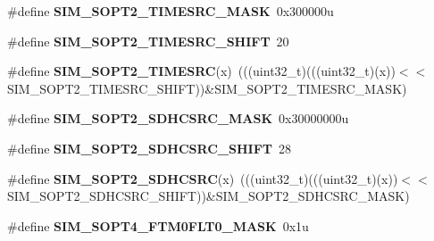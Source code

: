 \begin{DoxyCompactItemize}
\item 
\#define {\bfseries S\+I\+M\+\_\+\+S\+O\+P\+T2\+\_\+\+T\+I\+M\+E\+S\+R\+C\+\_\+\+M\+A\+SK}~0x300000u\hypertarget{group__SIM__Register__Masks_gab50a6e7eaa3b552b96f8cd0450a95395}{}\label{group__SIM__Register__Masks_gab50a6e7eaa3b552b96f8cd0450a95395}

\item 
\#define {\bfseries S\+I\+M\+\_\+\+S\+O\+P\+T2\+\_\+\+T\+I\+M\+E\+S\+R\+C\+\_\+\+S\+H\+I\+FT}~20\hypertarget{group__SIM__Register__Masks_ga808182bbe91aa5fedaede7122e4af1aa}{}\label{group__SIM__Register__Masks_ga808182bbe91aa5fedaede7122e4af1aa}

\item 
\#define {\bfseries S\+I\+M\+\_\+\+S\+O\+P\+T2\+\_\+\+T\+I\+M\+E\+S\+RC}(x)~(((uint32\+\_\+t)(((uint32\+\_\+t)(x))$<$$<$S\+I\+M\+\_\+\+S\+O\+P\+T2\+\_\+\+T\+I\+M\+E\+S\+R\+C\+\_\+\+S\+H\+I\+FT))\&S\+I\+M\+\_\+\+S\+O\+P\+T2\+\_\+\+T\+I\+M\+E\+S\+R\+C\+\_\+\+M\+A\+SK)\hypertarget{group__SIM__Register__Masks_gaf2c6b0c71d3139118270e0ded3521f53}{}\label{group__SIM__Register__Masks_gaf2c6b0c71d3139118270e0ded3521f53}

\item 
\#define {\bfseries S\+I\+M\+\_\+\+S\+O\+P\+T2\+\_\+\+S\+D\+H\+C\+S\+R\+C\+\_\+\+M\+A\+SK}~0x30000000u\hypertarget{group__SIM__Register__Masks_gadfe4a9ff5d8ba836d827d0d265dc3055}{}\label{group__SIM__Register__Masks_gadfe4a9ff5d8ba836d827d0d265dc3055}

\item 
\#define {\bfseries S\+I\+M\+\_\+\+S\+O\+P\+T2\+\_\+\+S\+D\+H\+C\+S\+R\+C\+\_\+\+S\+H\+I\+FT}~28\hypertarget{group__SIM__Register__Masks_gac0d4558ce58c6d9bf19af4f36c363562}{}\label{group__SIM__Register__Masks_gac0d4558ce58c6d9bf19af4f36c363562}

\item 
\#define {\bfseries S\+I\+M\+\_\+\+S\+O\+P\+T2\+\_\+\+S\+D\+H\+C\+S\+RC}(x)~(((uint32\+\_\+t)(((uint32\+\_\+t)(x))$<$$<$S\+I\+M\+\_\+\+S\+O\+P\+T2\+\_\+\+S\+D\+H\+C\+S\+R\+C\+\_\+\+S\+H\+I\+FT))\&S\+I\+M\+\_\+\+S\+O\+P\+T2\+\_\+\+S\+D\+H\+C\+S\+R\+C\+\_\+\+M\+A\+SK)\hypertarget{group__SIM__Register__Masks_ga1e15b52db62a3ffff08350dc9c6f590d}{}\label{group__SIM__Register__Masks_ga1e15b52db62a3ffff08350dc9c6f590d}

\item 
\#define {\bfseries S\+I\+M\+\_\+\+S\+O\+P\+T4\+\_\+\+F\+T\+M0\+F\+L\+T0\+\_\+\+M\+A\+SK}~0x1u\hypertarget{group__SIM__Register__Masks_gaa868cd9e56dc4f0280f6d1866da1ac57}{}\label{group__SIM__Register__Masks_gaa868cd9e56dc4f0280f6d1866da1ac57}


\end{DoxyCompactItemize}
